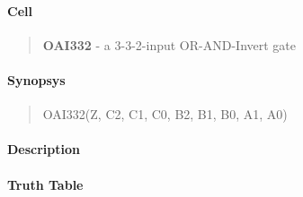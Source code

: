 \label{OAI332}
\paragraph{Cell}
\begin{quote}
    \textbf{OAI332} - a 3-3-2-input OR-AND-Invert gate
\end{quote}

\paragraph{Synopsys}
\begin{quote}
    OAI332(Z, C2, C1, C0, B2, B1, B0, A1, A0)
\end{quote}

\paragraph{Description}

%

\paragraph{Truth Table}


